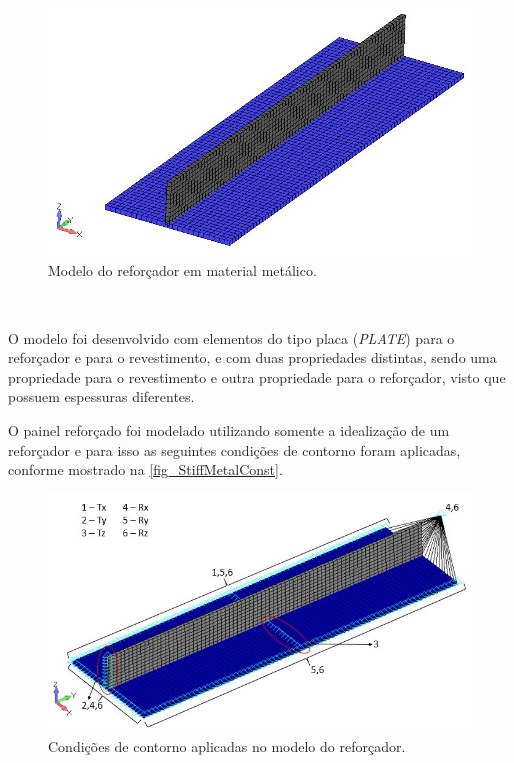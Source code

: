 {\begin{figure}[ht]
	\caption{\label{fig_StiffMetal}Modelo do reforçador em material metálico.}
  \centering
  \includegraphics[scale=0.7]{figura/StiffMetal}
\end{figure}
\

O modelo foi desenvolvido com elementos do tipo placa (\emph{PLATE}) para o reforçador e para o revestimento, e com duas propriedades distintas, sendo uma propriedade para o revestimento e outra propriedade para o reforçador, visto que possuem espessuras diferentes.

O painel reforçado foi modelado utilizando somente a idealização de um reforçador e para isso as seguintes condições de contorno foram aplicadas, conforme mostrado na \autoref{fig_StiffMetalConst}.

\begin{figure}[h]
	\caption{\label{fig_StiffMetalConst}Condições de contorno aplicadas no modelo do reforçador.}
  \centering
  \includegraphics[scale=0.7]{figura/StiffMetalConst}
\end{figure}
\

}
